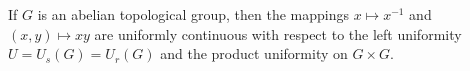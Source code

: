 If $G$ is an abelian topological group, then the mappings $x \mapsto x^{-1}$ and $(x, y) \mapsto xy$ are uniformly continuous with respect to the left uniformity $U = U_s(G) = U_r(G)$ and the product uniformity on $G \times G$.